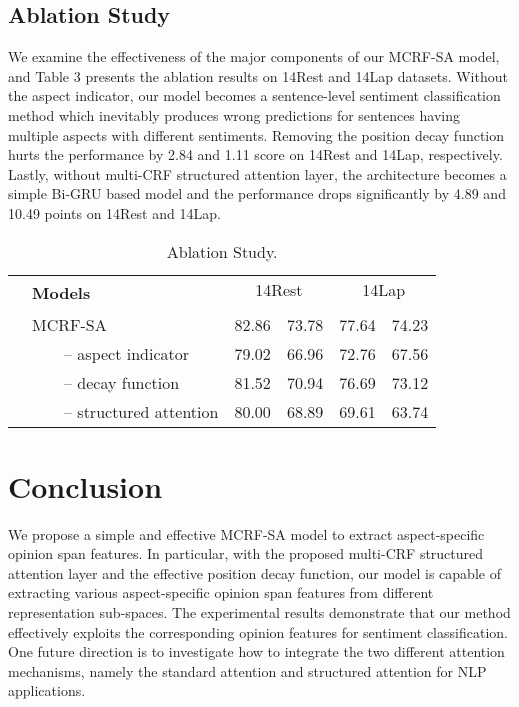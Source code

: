 \documentclass[11pt,a4paper]{article}
\begin{document}
\subsection{Ablation Study} 
We examine the effectiveness of the major components of our MCRF-SA model, and 
Table 3 presents the ablation results on 14Rest and 14Lap datasets.
Without the aspect indicator, our model becomes a sentence-level sentiment classification method which inevitably produces wrong predictions for sentences having multiple aspects with different sentiments. 
Removing the position decay function hurts the performance by 2.84 and 1.11  score on 14Rest and 14Lap,  respectively. 
Lastly,  without multi-CRF structured attention layer, the architecture becomes a simple Bi-GRU based model and the performance drops significantly by 4.89 and 10.49  points on 14Rest and 14Lap. 
\begin{table}[t!]
\centering
\resizebox{\columnwidth}{!}
{\begin{tabular}{llcccc}
    \toprule
      & \multirow{2}{*}{\textbf{Models}} & \multicolumn{2}{c}{14Rest}& \multicolumn{2}{c}{14Lap}  \\ \cmidrule(lr){3-4} \cmidrule(lr){5-6}
       & &  & &  & \\ \hline 
        &MCRF-SA & 82.86 & 73.78 & 77.64 & 74.23\\ 
        &~~~~--  aspect indicator & 79.02 & 66.96  & 72.76 & 67.56\\
        &~~~~--  decay function & 81.52 & 70.94 & 76.69 & 73.12\\
        &~~~~--  structured attention & 80.00 & 68.89 & 69.61 & 63.74 \\ 
        
    \bottomrule
    \end{tabular}}
\caption{Ablation Study. } 


\end{table}


\section{Conclusion}
We propose a simple and effective MCRF-SA model to extract aspect-specific opinion span features. In particular, with the proposed multi-CRF structured attention layer and the effective position decay function, our model is capable of extracting various aspect-specific opinion span features from different representation sub-spaces. The experimental results demonstrate that our method effectively exploits the corresponding opinion features for sentiment classification. One future direction is to investigate how to integrate the two different attention mechanisms, namely the standard attention  and  structured  attention for NLP applications. 
\end{document}
